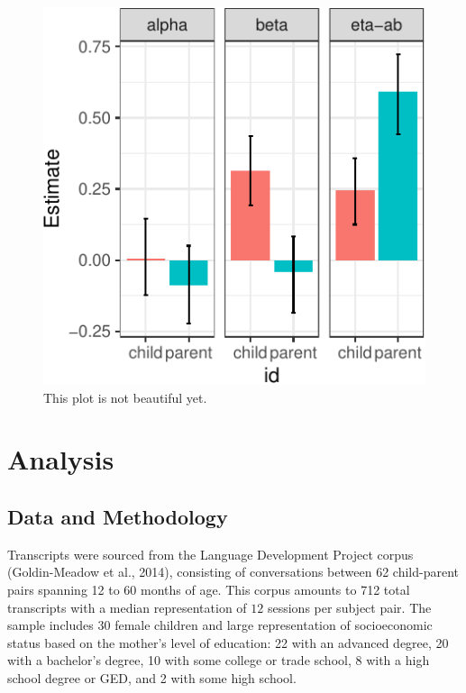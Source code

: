 \documentclass[10pt, letterpaper]{article}
\newenvironment{CodeChunk}{}{}
\begin{document}
\begin{CodeChunk}
\begin{figure}[H]
\includegraphics{figs/plot-1} \caption[This plot is not beautiful yet]{This plot is not beautiful yet.}\label{fig:plot}
\end{figure}
\end{CodeChunk}

\hypertarget{analysis}{%
\section{Analysis}\label{analysis}}

\hypertarget{data-and-methodology}{%
\subsection{Data and Methodology}\label{data-and-methodology}}

Transcripts were sourced from the Language Development Project corpus
(Goldin-Meadow et al., 2014), consisting of conversations between 62
child-parent pairs spanning 12 to 60 months of age. This corpus amounts
to 712 total transcripts with a median representation of \(12\) sessions
per subject pair. The sample includes 30 female children and large
representation of socioeconomic status based on the mother's level of
education: 22 with an advanced degree, 20 with a bachelor's degree, 10
with some college or trade school, 8 with a high school degree or GED,
and 2 with some high school.
\end{document}
